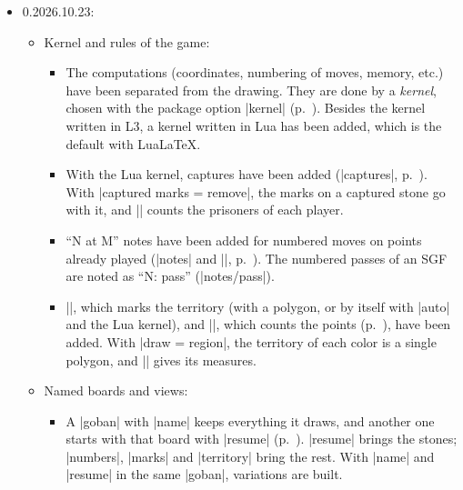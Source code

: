 \begin{itemize}
\begin{itemize}
$$			\item In Spanish, the colors are singular and the result also agrees with a name: ``Gana Negro'', ``Juega Blanco'', ``Gana Ana por abandono''. In Portuguese, ``Vitória de Ana''.
			\item |\pgfgostone|: a single stone in the text, without a board, with a mark or a number (|\pgfgostone[b, number = 5]|, p.~\pageref{subsec:piedra-texto}).
			\item |\pgfgoview| with several parts (|{F15, G15, C3:E5}|): one view per part, joined with |view/separator| and |view/last| (``and'' or its translation, p.~\pageref{subsec:vistas}).
		\end{itemize}
	\item 0.2026.10.23:
		\begin{itemize}
			\item Kernel and rules of the game:
				\begin{itemize}
					\item The computations (coordinates, numbering of moves, memory, etc.) have been separated from the drawing. They are done by a \emph{kernel}, chosen with the package option |kernel| (p.~\pageref{subsec:kernel}). Besides the kernel written in L3, a kernel written in Lua has been added, which is the default with Lua\LaTeX.
					\item With the Lua kernel, captures have been added (|captures|, p.~\pageref{subsec:capturas}). With |captured marks = remove|, the marks on a captured stone go with it, and |\pgfgoprisoners| counts the prisoners of each player.
					\item ``N at M'' notes have been added for numbered moves on points already played (|notes| and |\pgfgomovenotes|, p.~\pageref{subsec:notas}). The numbered passes of an SGF are noted as ``N: pass'' (|notes/pass|).
					\item |\territory|, which marks the territory (with a polygon, or by itself with |auto| and the Lua kernel), and |\pgfgoscore|, which counts the points (p.~\pageref{subsec:territorio}), have been added. With |draw = region|, the territory of each color is a single polygon, and |\pgfgoregion| gives its measures.
				\end{itemize}
			\item Named boards and views:
				\begin{itemize}
					\item A |goban| with |name| keeps everything it draws, and another one starts with that board with |resume| (p.~\pageref{subsec:recordar}). |resume| brings the stones; |numbers|, |marks| and |territory| bring the rest. With |name| and |resume| in the same |goban|, variations are built.

\end{itemize}
\end{itemize}
\end{itemize}
